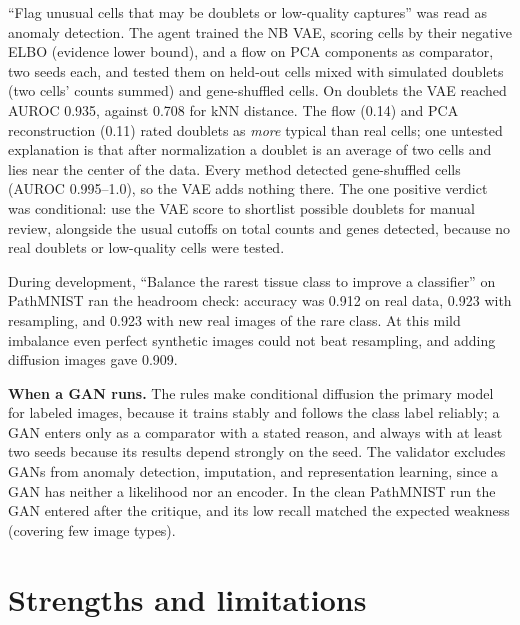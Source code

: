 \documentclass[10pt]{article}
\begin{document}
``Flag unusual cells that may be doublets or low-quality captures'' was read as anomaly detection. The agent trained the
NB VAE, scoring cells by their negative ELBO (evidence lower bound), and a flow on PCA components as comparator, two seeds
each, and tested them on held-out cells mixed with simulated doublets (two cells' counts summed) and gene-shuffled cells.
On doublets the VAE reached AUROC 0.935, against 0.708 for kNN distance. The flow (0.14) and PCA reconstruction (0.11)
rated doublets as \emph{more} typical than real cells; one untested explanation is that after normalization a doublet
is an average of two cells and lies near the center of the data. Every method detected gene-shuffled cells (AUROC
0.995--1.0), so the VAE adds nothing there. The one positive verdict was conditional: use the VAE score to shortlist
possible doublets for manual review, alongside the usual cutoffs on total counts and genes detected, because no real
doublets or low-quality cells were tested.

During development, ``Balance the rarest tissue class to improve a classifier'' on PathMNIST ran the headroom check:
accuracy was 0.912 on real data, 0.923 with resampling, and 0.923 with new real images of the rare class. At this mild
imbalance even perfect synthetic images could not beat resampling, and adding diffusion images gave 0.909.

\textbf{When a GAN runs.} The rules make conditional diffusion the primary model for labeled images, because it trains
stably and follows the class label reliably; a GAN enters only as a comparator with a stated reason, and always with at
least two seeds because its results depend strongly on the seed. The validator excludes GANs from anomaly detection,
imputation, and representation learning, since a GAN has neither a likelihood nor an encoder. In the clean PathMNIST
run the GAN entered after the critique, and its low recall matched the expected weakness (covering few image types).

\section{Strengths and limitations}
\end{document}

